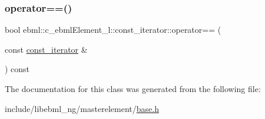 \subsubsection{\texorpdfstring{operator==()}{operator==()}}
{\footnotesize\ttfamily bool ebml\+::c\+\_\+ebml\+Element\+\_\+l\+::const\+\_\+iterator\+::operator== (\begin{DoxyParamCaption}\item[{const \mbox{\hyperlink{classebml_1_1c__ebmlElement__l_1_1const__iterator}{const\+\_\+iterator}} \&}]{ }\end{DoxyParamCaption}) const}



The documentation for this class was generated from the following file\+:\begin{DoxyCompactItemize}
\item 
include/libebml\+\_\+ng/masterelement/\mbox{\hyperlink{masterelement_2base_8h}{base.\+h}}\end{DoxyCompactItemize}
